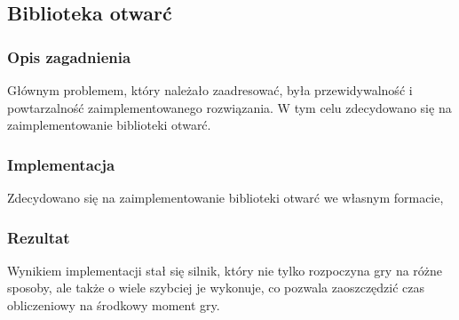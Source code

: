 \subsection{Biblioteka otwarć}
\label{subsec:biblioteka-otwarc}

\subsubsection{Opis zagadnienia}
Głównym problemem, który należało zaadresować, była przewidywalność i powtarzalność zaimplementowanego rozwiązania.
W tym celu zdecydowano się na zaimplementowanie biblioteki otwarć.

\subsubsection{Implementacja}
Zdecydowano się na zaimplementowanie biblioteki otwarć we własnym formacie,

\subsubsection{Rezultat}
Wynikiem implementacji stał się silnik, który nie tylko rozpoczyna gry na różne sposoby, ale także o wiele szybciej je wykonuje, co pozwala zaoszczędzić czas obliczeniowy na środkowy moment gry.